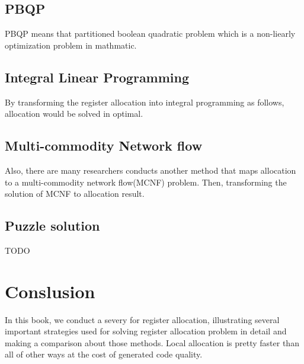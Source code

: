 \documentclass[12pt]{book}
\begin{document}
\section{PBQP}
PBQP means that partitioned boolean quadratic problem which is a non-liearly
optimization problem in mathmatic.

\section{Integral Linear Programming}
By transforming the register allocation into integral programming as follows,
allocation would be solved in optimal.

\section{Multi-commodity Network flow}
Also, there are many researchers conducts another method that maps allocation to
a multi-commodity network flow(MCNF) problem. Then, transforming the solution of MCNF
to allocation result.

\section{Puzzle solution}
TODO

\chapter{Conslusion}
In this book, we conduct a severy for register allocation, illustrating several
important strategies used for solving register allocation problem in detail and
making a comparison about those methods. Local allocation is pretty faster than
all of other ways at the cost of generated code quality.
\end{document}
